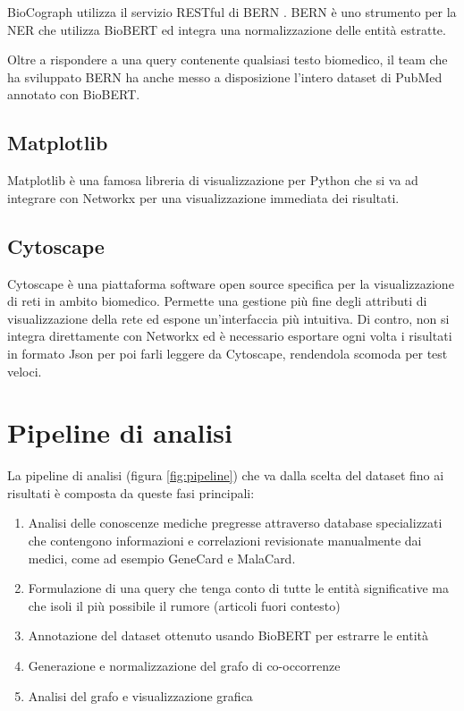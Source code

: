 \documentclass[12pt]{report}
\begin{document}
BioCograph utilizza il servizio RESTful di BERN \cite{bern,berngit}. BERN è uno strumento per la NER che utilizza BioBERT ed integra una normalizzazione delle entità estratte.

Oltre a rispondere a una query contenente qualsiasi testo biomedico, il team che ha sviluppato BERN ha anche messo a disposizione l'intero dataset di PubMed annotato con BioBERT.

\section{Matplotlib}
Matplotlib \cite{matplotlib} è una famosa libreria di visualizzazione per Python che si va ad integrare con Networkx per una visualizzazione immediata dei risultati.

\section{Cytoscape}
Cytoscape \cite{cytoscape} è una piattaforma software open source specifica per la visualizzazione di reti in ambito biomedico. Permette una gestione più fine degli attributi di visualizzazione della rete ed espone un'interfaccia più intuitiva. Di contro, non si integra direttamente con Networkx ed è necessario esportare ogni volta i risultati in formato Json per poi farli leggere da Cytoscape, rendendola scomoda per test veloci. 

\chapter{Pipeline di analisi}

La pipeline di analisi (figura \ref{fig:pipeline}) che va dalla scelta del dataset fino ai risultati è composta da queste fasi principali:
\begin{enumerate}
    \item Analisi delle conoscenze mediche pregresse attraverso database specializzati che contengono informazioni e correlazioni revisionate manualmente dai medici, come ad esempio GeneCard e MalaCard. 
    \item Formulazione di una query che tenga conto di tutte le entità significative ma che isoli il più possibile il rumore (articoli fuori contesto)
    \item Annotazione del dataset ottenuto usando BioBERT per estrarre le entità
    \item Generazione e normalizzazione del grafo di co-occorrenze
    \item Analisi del grafo e visualizzazione grafica
\end{enumerate}
\end{document}
